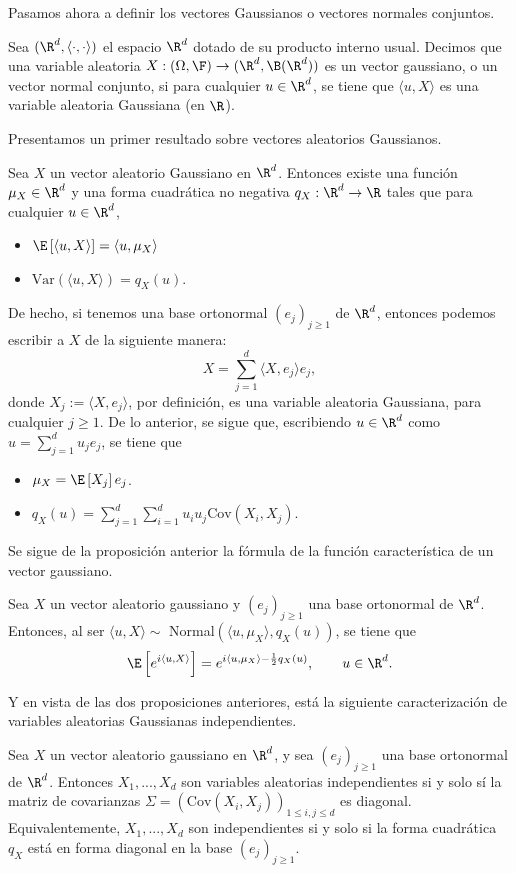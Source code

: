  Pasamos ahora a definir los vectores Gaussianos o vectores normales conjuntos. 
 \begin{dfn} 
  Sea $(\R^d, \langle\cdot,\cdot\rangle)$ el espacio $\R^{d}$ dotado de su producto interno usual. Decimos que una variable aleatoria $X:(\Omega,\F)\to (\R^{d},\B(\R^d))$ es un vector gaussiano, o un vector normal conjunto, si para cualquier $u\in \R^d$, se tiene que $\langle u,X\rangle$ es una variable aleatoria Gaussiana (en $\R$).
  \end{dfn}
Presentamos un primer resultado sobre vectores aleatorios Gaussianos.
\begin{prop} 
Sea $X$ un vector aleatorio Gaussiano en $\R^{d}$. Entonces existe una función $\mu_X\in\R^d$ y una forma cuadrática no negativa $q_X:\R^d\to \R$ tales que para cualquier $u\in \R^d$,
\begin{itemize}
    \item $\E\left[\langle u,X\rangle\right]=\langle u,\mu_X\rangle$
    \item $\text{Var}\left(\langle u,X\rangle\right)=q_X(u)$.
\end{itemize}
De hecho, si tenemos una base ortonormal $(e_{j})_{j\geq1}$ de $\R^{d}$, entonces podemos escribir a $X$ de la siguiente manera:
\[
X=\sum_{j=1}^{d}\langle X,e_j\rangle e_j,  
\]
donde $X_j:=\langle X,e_j\rangle$, por definición, es una variable aleatoria Gaussiana, para cualquier $j\geq1$. De lo anterior, se sigue que, escribiendo $u\in \R^d$ como $u=\sum_{j=1}^{d}u_je_j$, se tiene que 
\begin{itemize}
    \item $\mu_X=\E\left[X_j\right]e_j$.
    \item $q_X(u)=\sum_{j=1}^{d}\sum_{i=1}^{d}u_iu_j \text{Cov}\left(X_i,X_j\right)$.
\end{itemize}
 \end{prop}

Se sigue de la proposición anterior la fórmula de la función característica de un vector gaussiano.
\begin{prop} 
 Sea $X$ un vector aleatorio gaussiano y $(e_j)_{j\geq1}$ una base ortonormal de $\R^{d}$. Entonces, al ser $\langle u,X\rangle\sim$ Normal$(\langle u,\mu_X\rangle,q_X(u))$, se tiene que %
 \[
 \E\left[e^{i\langle u,X\rangle}\right]=e^{i \langle u,\mu_X\rangle-\frac{1}{2}q_X(u)}, \qquad u\in \R^d.
 \]
 \end{prop}
Y en vista de las dos proposiciones anteriores, está la siguiente caracterización de variables aleatorias Gaussianas independientes.
\begin{prop} 
 Sea $X$ un vector aleatorio gaussiano en $\R^{d}$, y sea $(e_j)_{j\geq1}$ una base ortonormal de $\R^{d}$. Entonces $X_1,...,X_d$ son variables aleatorias independientes si y solo sí la matriz de covarianzas $\Sigma=(\text{Cov}\left(X_i,X_j\right))_{1\leq i,j\leq d}$ es diagonal. Equivalentemente, $X_1,...,X_d$ son independientes si y solo si la forma cuadrática $q_X$ está en forma diagonal en la base $(e_j)_{j\geq1}$.
 \end{prop}

